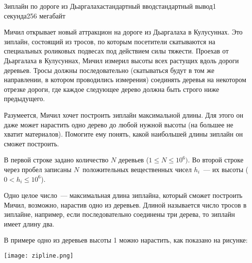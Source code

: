 \begin{problem}[(Павлов А.\,В.)]{Зиплайн по дороге из Дьаргалаха}{стандартный ввод}{стандартный вывод}{1 секунда}{256 мегабайт}

Мичил открывает новый аттракцион на дороге из Дьаргалаха в Кулусуннах. Это зиплайн, состоящий из тросов, по которым посетители скатываются на специальных роликовых подвесах под действием силы тяжести. Проехав от Дьаргалаха в Кулусуннах, Мичил измерил высоты всех растущих вдоль дороги деревьев. Тросы должны последовательно (скатываться будут в том же направлении, в котором проводились измерения) соединять деревья на некотором отрезке дороги, где каждое следующее дерево должна быть строго ниже предыдущего. 

Разумеется, Мичил хочет построить зиплайн максимальной длины. Для этого он даже может нарастить одно дерево до любой нужной высоты (на большее не хватит материалов). Помогите ему понять, какой наибольшей длины зиплайн он сможет построить.

\InputFile
В первой строке задано количество $N$ деревьев ($1 \leq N \leq 10^6)$. Во второй строке через пробел записаны $N$~положительных вещественных чисел $h_i$~--- их высоты ($0 < h_i \leq 10^6$).

\OutputFile
Одно целое число~--- максимальная длина зиплайна, который сможет построить Мичил, возможно, нарастив одно из деревьев. Длиной называется число тросов в зиплайне, например, если последовательно соединены три дерева, то зиплайн имеет длину два.

\Example

\begin{example}
%
\end{example}

\Note
В примере одно из деревьев высоты 1 можно нарастить, как показано на рисунке:\\
\centerline{\texttt{[image: zipline.png]}}

\end{problem}

